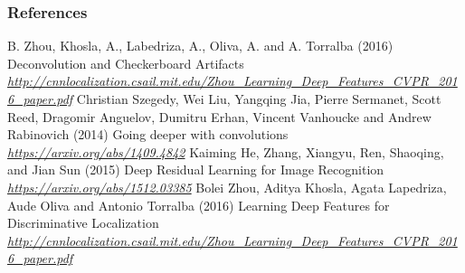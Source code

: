 \begin{vbframe}
\frametitle{References}
\footnotesize{
\begin{thebibliography}{99}

 B. Zhou, Khosla, A., Labedriza, A., Oliva, A. and A. Torralba (2016)
\newblock Deconvolution and Checkerboard Artifacts
\newblock \emph{\url{http://cnnlocalization.csail.mit.edu/Zhou_Learning_Deep_Features_CVPR_2016_paper.pdf}}
 Christian Szegedy, Wei Liu, Yangqing Jia, Pierre Sermanet, Scott Reed, Dragomir Anguelov, Dumitru Erhan, Vincent Vanhoucke and Andrew Rabinovich (2014)
\newblock Going deeper with convolutions
\newblock \emph{\url{https://arxiv.org/abs/1409.4842}}
 Kaiming He, Zhang, Xiangyu, Ren, Shaoqing, and Jian Sun (2015)
\newblock Deep Residual Learning for Image Recognition
\newblock \emph{\url{https://arxiv.org/abs/1512.03385}}
 Bolei Zhou, Aditya Khosla, Agata Lapedriza, Aude Oliva and Antonio Torralba (2016)
\newblock Learning Deep Features for Discriminative Localization
\newblock \emph{\url{http://cnnlocalization.csail.mit.edu/Zhou_Learning_Deep_Features_CVPR_2016_paper.pdf}}



\end{thebibliography}
}
\end{vbframe}

\endlecture

